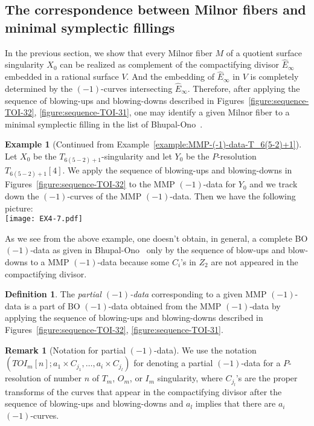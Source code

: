 \documentclass[reqno, twoside, a4paper]{amsart}
\theoremstyle{definition}
\newtheorem{definition}[theorem]{Definition}
\newtheorem{remark}[theorem]{Remark}
\newtheorem{example}[theorem]{Example}
\numberwithin{equation}{section}
\begin{document}
\subsection{The correspondence between Milnor fibers and minimal symplectic fillings}
\label{subsection:Milnor-vs-filling}

In the previous section, we show that every Milnor fiber $M$ of a quotient surface singularity $X_0$ can be realized as complement of the compactifying divisor $\widehat{E}_{\infty}$ embedded in a rational surface $V$. And the embedding of $\widehat{E}_{\infty}$ in $V$ is completely determined by the $(-1)$-curves intersecting $\widehat{E}_{\infty}$. Therefore, after applying the sequence of blowing-ups and blowing-downs described in Figures~\ref{figure:sequence-TOI-32}, \ref{figure:sequence-TOI-31}, one may identify a given Milnor fiber to a minimal symplectic filling in the list of Bhupal-Ono~\cite[\S5]{Bhupal-Ono-2012}.

\begin{example}[Continued from Example~\ref{example:MMP-(-1)-data-T_6(5-2)+1}]

Let $X_0$ be the $T_{6(5-2)+1}$-singularity and let $Y_0$ be the $P$-resolution $T_{6(5-2)+1}[4]$. We apply the sequence of blowing-ups and blowing-downs in Figures~\ref{figure:sequence-TOI-32} to the MMP $(-1)$-data for $Y_0$ and we track down the $(-1)$-curves of the MMP $(-1)$-data. Then we have the following picture:
%
\\
\centering
\texttt{[image: EX4-7.pdf]}
\end{example}

As we see from the above example, one doesn't obtain, in general, a complete BO $(-1)$-data as given in Bhupal-Ono~\cite[\S5]{Bhupal-Ono-2012} only by the sequence of blow-ups and blow-downs to a MMP $(-1)$-data because some $C_i$'s in $Z_2$ are not appeared in the compactifying divisor.

\begin{definition}
The \emph{partial $(-1)$-data} corresponding to a given MMP $(-1)$-data is a part of BO $(-1)$-data obtained from the MMP $(-1)$-data by applying the sequence of blowing-ups and blowing-downs described in Figures~\ref{figure:sequence-TOI-32}, \ref{figure:sequence-TOI-31}.
\end{definition}

\begin{remark}[Notation for partial $(-1)$-data]
We use the notation $(TOI_m[n]; a_1 \times C_{j_1}, \dotsc , a_i \times C_{j_l})$ for denoting a partial $(-1)$-data for a $P$-resolution of number $n$ of $T_m$, $O_m$, or $I_m$ singularity, where $C_{j_l}$'s are the proper transforms of the curves that appear in the compactifying divisor after the sequence of blowing-ups and blowing-downs and $a_l$ implies that there are $a_i$ $(-1)$-curves.
\end{remark}
\end{document}
